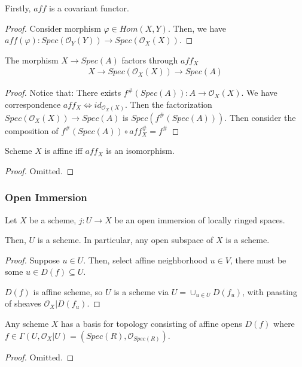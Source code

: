 \documentclass[Total.tex]{subfiles}
\begin{document}
		
		\begin{lemma}
			Firstly, $aff$ is a covariant functor.
		\end{lemma}
		\begin{proof}
			Consider morphism $\varphi\in Hom(X,Y)$. Then, we have $aff(\varphi):Spec(\mathcal{O}_Y(Y))\rightarrow Spec(\mathcal{O}_X(X))$. 
		\end{proof}
		\begin{proposition}
			The morphism $X\rightarrow Spec(A)$ factors through $aff_X$
			\begin{gather*}
				X\rightarrow Spec(\mathcal{O}_X(X))\rightarrow Spec(A)
			\end{gather*}
		\end{proposition}
		\begin{proof}
			Notice that: There exists $f^\#(Spec(A)):A\rightarrow \mathcal{O}_X(X)$. We have correspondence $aff_X\Leftrightarrow id_{\mathcal{O}_X(X)}$. Then the factorization $Spec(\mathcal{O}_X(X))\rightarrow Spec(A)$ is $Spec(f^\#(Spec(A)))$. Then consider the composition of $f^\#(Spec(A))\circ aff_X^\#=f^\#$
		\end{proof}
		\begin{proposition}
			Scheme $X$ is affine iff $aff_X$ is an isomorphism.
		\end{proposition}
		\begin{proof}
			Omitted.
		\end{proof}
		\subsubsection{Open Immersion}
		
		\begin{lemma}
			Let $X$ be a scheme, $j:U\rightarrow X$ be an open immersion of locally ringed spaces.
			
			Then, $U$ is a scheme. In particular, any open subspace of $X$ is a scheme.
		\end{lemma}
		
		\begin{proof}
			Suppose $u\in U$. Then, select affine neighborhood $u\in V$, there must be some $u\in D(f)\subseteq U$.
			
			$D(f)$ is affine scheme, so $U$ is a scheme via $U=\cup_{u\in U} D(f_u)$, with paasting of sheaves $\mathcal{O}_X|D(f_u)$.
		\end{proof}
		
		\begin{corollary}
			Any scheme $X$ has a basis for topology consisting of affine opens $D(f)$ where $f\in \Gamma(U,\mathcal{O}_X|U)=(Spec(R),\mathcal{O}_{Spec(R)})$.
		\end{corollary}
		\begin{proof}
			Omitted.
		\end{proof}
\end{document}
